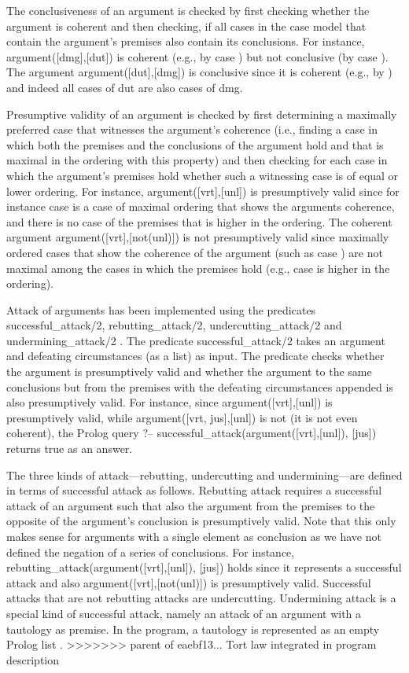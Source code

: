 \documentclass{IOS-Book-Article}
\begin{document}
The conclusiveness of an argument is checked by first checking whether the argument is coherent and then checking, if all cases in the case model that contain the argument's premises also contain its conclusions. For instance, {\mf argument([dmg],[dut])} is coherent (e.g., by case {}) but not conclusive (by case {}). The argument {\mf argument([dut],[dmg])} is conclusive since it is coherent (e.g., by {}) and indeed all cases of {\mf dut} are also cases of {\mf dmg}.

Presumptive validity of an argument is checked by first determining a maximally preferred case that witnesses the argument's coherence (i.e., finding a case in which both the premises and the conclusions of the argument hold and that is maximal in the ordering with this property) and then checking for each case in which the argument's premises hold whether such a witnessing case is of equal or lower ordering. For instance, {\mf argument([vrt],[unl])} is presumptively valid since for instance case {} is a case of maximal ordering that shows the arguments coherence, and there is no case of the premises that is higher in the ordering. The coherent argument {\mf argument([vrt],[not(unl)])} is not presumptively valid since maximally ordered cases that show the coherence of the argument (such as case {}) are not maximal among the cases in which the premises hold (e.g., case {} is higher in the ordering).

Attack of arguments has been implemented using the predicates {\mf successful\_attack/2}, {\mf rebutting\_attack/2}, {\mf undercutting\_attack/2} and {\mf undermining\_attack/2} . The predicate {\mf successful\_attack/2} takes an argument and defeating circumstances (as a list) as input. The predicate checks whether the argument is presumptively valid and whether the argument to the same conclusions but from the premises with the defeating circumstances appended is also presumptively valid. For instance, since {\mf argument([vrt],[unl])} is presumptively valid, while {\mf argument([vrt, jus],[unl])} is not (it is not even coherent), the Prolog query {\mf ?-- successful\_attack(argument([vrt],[unl]), [jus])} returns {\mf true} as an answer.

The three kinds of attack---rebutting, undercutting and undermining---are defined in terms of successful attack as follows. Rebutting attack requires a successful attack of an argument such that also the argument from the premises to the opposite of the argument's conclusion is presumptively valid. Note that this only makes sense for arguments with a single element as conclusion as we have not defined the negation of a series of conclusions. For instance, {\mf rebutting\_attack(argument([vrt],[unl]), [jus])} holds since it represents a successful attack and also argument([vrt],[not(unl)]) is presumptively valid. Successful attacks that are not rebutting attacks are undercutting. Undermining attack is a special kind of successful attack, namely an attack of an argument with a tautology as premise. In the program, a tautology is represented as an empty Prolog list {\mf [ ]}.
>>>>>>> parent of eaebf13... Tort law integrated in program description
\end{document}
